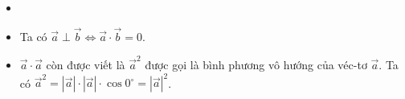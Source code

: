 \begin{note} 
	\begin{itemize}
		\item []
		\item Ta có $\overrightarrow{a} \perp \overrightarrow{b} \Leftrightarrow \overrightarrow{a} \cdot \overrightarrow{b} = 0$.
		\item $\overrightarrow{a}\cdot \overrightarrow{a}$ còn được viết là $\overrightarrow{a}^2$ được gọi là bình phương vô hướng của véc-tơ $\overrightarrow{a}$. Ta có $\overrightarrow{a}^2 = |\overrightarrow{a}|\cdot |\overrightarrow{a}|\cdot \cos 0^\circ = |\overrightarrow{a}|^2$.
	\end{itemize}
\end{note}
